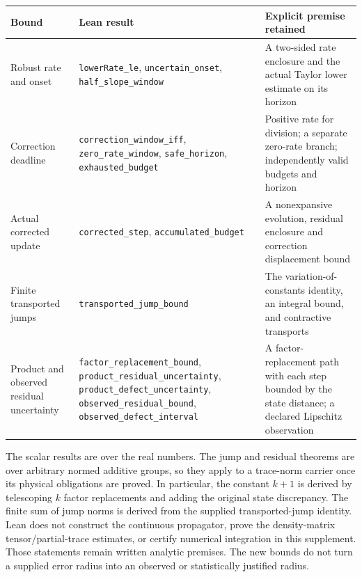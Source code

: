 \documentclass[
  11pt,
]{article}
\begin{document}
\begin{longtable}[]{@{}
  >{\raggedright\arraybackslash}p{}
  >{\raggedright\arraybackslash}p{}
  >{\raggedright\arraybackslash}p{}@{}}
\toprule\noalign{}
\begin{minipage}[b]{\linewidth}\raggedright
Bound
\end{minipage} & \begin{minipage}[b]{\linewidth}\raggedright
Lean result
\end{minipage} & \begin{minipage}[b]{\linewidth}\raggedright
Explicit premise retained
\end{minipage} \\
\midrule\noalign{}
\endhead
\bottomrule\noalign{}
\endlastfoot
Robust rate and onset & \texttt{lowerRate\_\allowbreak{}le}, \texttt{uncertain\_\allowbreak{}onset}, \texttt{half\_\allowbreak{}slope\_\allowbreak{}window} & A two-sided rate enclosure and the actual Taylor lower estimate on its horizon \\
Correction deadline & \texttt{correction\_\allowbreak{}window\_\allowbreak{}iff}, \texttt{zero\_\allowbreak{}rate\_\allowbreak{}window}, \texttt{safe\_\allowbreak{}horizon}, \texttt{exhausted\_\allowbreak{}budget} & Positive rate for division; a separate zero-rate branch; independently valid budgets and horizon \\
Actual corrected update & \texttt{corrected\_\allowbreak{}step}, \texttt{accumulated\_\allowbreak{}budget} & A nonexpansive evolution, residual enclosure and correction displacement bound \\
Finite transported jumps & \texttt{transported\_\allowbreak{}jump\_\allowbreak{}bound} & The variation-of-constants identity, an integral bound, and contractive transports \\
Product and observed residual uncertainty & \texttt{factor\_\allowbreak{}replacement\_\allowbreak{}bound}, \texttt{product\_\allowbreak{}residual\_\allowbreak{}uncertainty}, \texttt{product\_\allowbreak{}defect\_\allowbreak{}uncertainty}, \texttt{observed\_\allowbreak{}residual\_\allowbreak{}bound}, \texttt{observed\_\allowbreak{}defect\_\allowbreak{}interval} & A factor-replacement path with each step bounded by the state distance; a declared Lipschitz observation \\
\end{longtable}

The scalar results are over the real numbers. The jump and residual theorems
are over arbitrary normed additive groups, so they apply to a trace-norm
carrier once its physical obligations are proved. In particular, the constant
\(k+1\) is derived by telescoping \(k\) factor replacements and adding the original
state discrepancy. The finite sum of jump norms is derived from the supplied
transported-jump identity. Lean does not construct the continuous propagator,
prove the density-matrix tensor/partial-trace estimates, or certify numerical
integration in this supplement. Those statements remain written analytic
premises. The new bounds do not turn a supplied error radius into an observed
or statistically justified radius.
\end{document}
